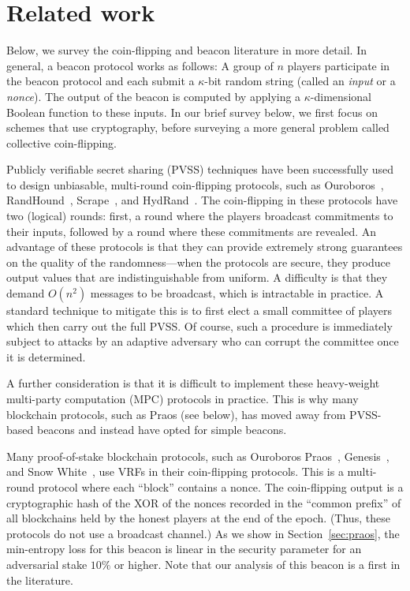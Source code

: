 \section{Related work}\label{sec:praos-related-work}


Below, we survey the coin-flipping and beacon literature in more detail. 
In general, a beacon protocol works as follows: 
A group of $n$ players participate in the beacon protocol 
and each submit a $\kappa$-bit random string (called an \emph{input} or a \emph{nonce}). 
The output of the beacon is computed by applying 
a $\kappa$-dimensional Boolean function to these inputs. 
In our brief survey below, we first focus on schemes that use cryptography, 
before surveying a more general problem called collective coin-flipping.



Publicly verifiable secret sharing (PVSS) techniques have been
successfully used to design unbiasable, multi-round coin-flipping
protocols, such as Ouroboros~\cite{Ouroboros},
RandHound~\cite{RandHound}, Scrape~\cite{Scrape}, and
HydRand~\cite{HydRand}.  The coin-flipping in these protocols have two
(logical) rounds: first, a round where the players broadcast
commitments to their inputs, followed by a round where these
commitments are revealed. An advantage of these protocols is that they
can provide extremely strong guarantees on the quality of the
randomness---when the protocols are secure, they produce output values
that are indistinguishable from uniform. A difficulty is that they
demand $O(n^2)$ messages to be broadcast, which is intractable in
practice. A standard technique to mitigate this is to first elect a small
committee of players which then carry out the full PVSS. Of course,
such a procedure is immediately subject to attacks by an adaptive
adversary who can corrupt the committee once it is determined.

A further consideration is that it is difficult to implement 
these heavy-weight multi-party computation (MPC) protocols in practice. 
This is why many blockchain protocols, 
such as Praos (see below), 
has moved away from PVSS-based beacons and instead 
have opted for simple beacons.



Many proof-of-stake blockchain
protocols, such as Ouroboros Praos~\cite{Praos}, 
Genesis~\cite{Genesis}, and Snow White~\cite {SnowWhite}, 
use VRFs 
in their coin-flipping protocols. 
This is a multi-round protocol 
where each ``block'' contains a nonce.  
The coin-flipping output is a cryptographic hash 
of the XOR of the nonces 
recorded in the ``common prefix'' of all 
blockchains held by the honest players 
at the end of the epoch. 
(Thus, these protocols do not use a broadcast channel.)
As we show in Section~\ref{sec:praos}, 
the min-entropy loss for this beacon 
is linear in the security parameter 
for an adversarial stake $10\%$ or higher.
Note that our analysis of this beacon 
is a first in the literature. 


